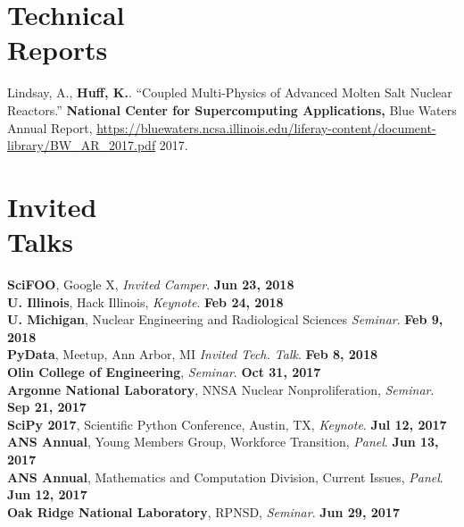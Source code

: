 \documentclass[margin,line]{resume}
\begin{document}
\begin{resume}
    \section{\mysidestyle Technical\\Reports}
    \begin{bibenum} 
      \item Lindsay, A., \textbf{Huff, K.}. ``Coupled Multi-Physics of Advanced 
              Molten Salt Nuclear Reactors.'' \textbf{National Center for 
              Supercomputing Applications,} Blue Waters Annual Report, 
              \url{https://bluewaters.ncsa.illinois.edu/liferay-content/document-library/BW_AR_2017.pdf} 
              2017.  
    \end{bibenum}
    \section{\mysidestyle Invited\\Talks}
      \textbf{SciFOO}, Google X, \emph{Invited Camper}.  \hfill\textbf{Jun 23, 2018}\\
      \textbf{U. Illinois}, Hack Illinois, \emph{Keynote}.  \hfill\textbf{Feb 24, 2018}\\
      \textbf{U. Michigan}, Nuclear Engineering and Radiological Sciences \emph{Seminar}.  \hfill\textbf{Feb 9, 2018}\\
      \textbf{PyData}, Meetup, Ann Arbor, MI \emph{Invited Tech. Talk}.  \hfill\textbf{Feb 8, 2018}\\
      \textbf{Olin College of Engineering}, \emph{Seminar}.  \hfill\textbf{Oct 31, 2017}\\
      \textbf{Argonne National Laboratory}, NNSA Nuclear Nonproliferation, \emph{Seminar}.  \hfill\textbf{Sep 21, 2017}\\
      \textbf{SciPy 2017}, Scientific Python Conference, Austin, TX, \emph{Keynote}.  \hfill\textbf{Jul 12, 2017}\\
      \textbf{ANS Annual}, Young Members Group, Workforce Transition, \emph{Panel}.  \hfill\textbf{Jun 13, 2017}\\
      \textbf{ANS Annual}, Mathematics and Computation Division, Current Issues, \emph{Panel}.  \hfill\textbf{Jun 12, 2017}\\
      \textbf{Oak Ridge National Laboratory}, RPNSD, \emph{Seminar}.  \hfill\textbf{Jun 29, 2017}
               \vspace{-2mm}

\end{resume}
\end{document}
